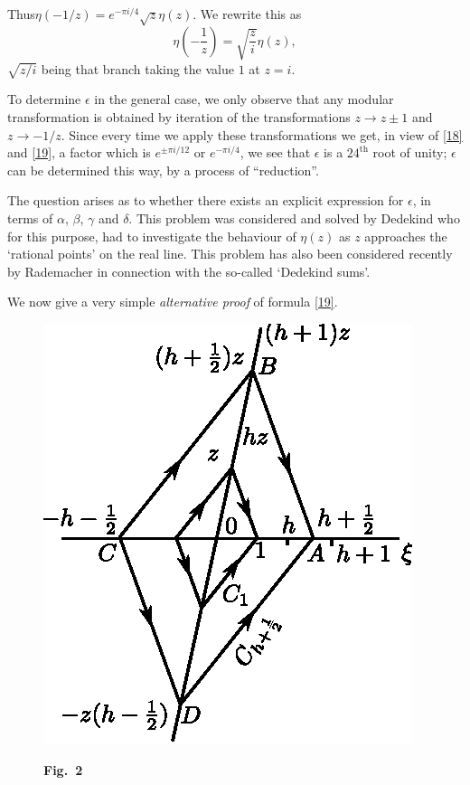 Thus\pageoriginale $\eta(-1/z)=e^{-\pi i/4}\sqrt{z}\eta(z)$. We
rewrite this as
\begin{equation*}
\eta\left(-\frac{1}{z}\right)=\sqrt{\frac{z}{i}}\eta(z),\tag{19}\label{19}
\end{equation*}
$\sqrt{z/i}$ being that branch taking the value $1$ at $z=i$.

To determine $\epsilon$ in the general case, we only observe that any
modular transformation is obtained by iteration of the transformations
$z\to z\pm 1$ and $z\to -1/z$. Since every time we apply these
transformations we get, in view of \eqref{18} and \eqref{19}, a factor
which is $e^{\pm \pi i/12}$ or $e^{-\pi i/4}$, we see that $\epsilon$
is a $24^{\text{th}}$ root of unity; $\epsilon$ can be determined this
way, by a process of ``reduction''.

The question arises as to whether there exists an explicit expression
for $\epsilon$, in terms of $\alpha$, $\beta$, $\gamma$ and
$\delta$. This problem was considered and solved by Dedekind who for
this purpose, had to investigate the behaviour of $\eta(z)$ as $z$
approaches the `rational points' on the real line. This problem has
also been considered recently by Rademacher in connection with the
so-called `Dedekind sums'.

We now give a very simple {\em alternative proof} of formula
\eqref{19}.
\begin{figure}[H]
\centering
\includegraphics{fig2.eps}

\medskip
\centerline{\bf Fig.~2}
\end{figure}

